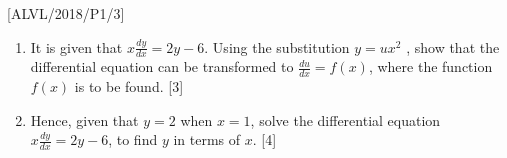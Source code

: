 \item {[}ALVL/2018/P1/3{]}
\begin{enumerate}
\item It is given that $x\frac{dy}{dx}=2y-6$. Using the substitution $y=ux^{2}$
, show that the differential equation can be transformed to $\frac{du}{dx}=f\left(x\right)$,
where the function $f\left(x\right)$ is to be found. \hfill{}{[}3{]}
\item Hence, given that $y=2$ when $x=1$, solve the differential equation
$x\frac{dy}{dx}=2y-6$, to find $y$ in terms of $x$.\hfill{} {[}4{]}
\end{enumerate}
